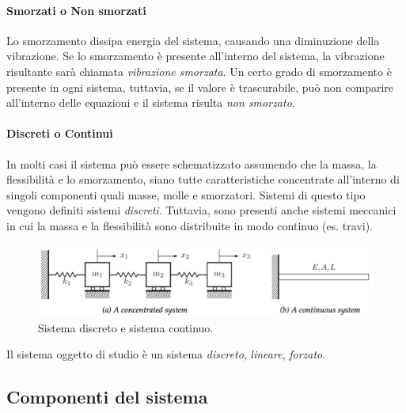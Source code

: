 \paragraph{Smorzati o Non smorzati} Lo smorzamento dissipa energia del sistema, causando una diminuzione della vibrazione. Se lo smorzamento è presente all'interno del sistema, la vibrazione risultante sarà chiamata \textit{vibrazione smorzata}. Un certo grado di smorzamento è presente in ogni sistema, tuttavia, se il valore è trascurabile, può non comparire all'interno delle equazioni e il sistema risulta \textit{non smorzato}.
\paragraph{Discreti o Continui} In molti casi il sistema può essere schematizzato assumendo che la massa, la flessibilità e lo smorzamento, siano tutte caratteristiche concentrate all'interno di singoli componenti quali masse, molle e smorzatori. Sistemi di questo tipo vengono definiti sistemi \textit{discreti}. Tuttavia, sono presenti anche sistemi meccanici in cui la massa e la flessibilità sono distribuite in modo continuo (es. travi).
\begin{figure}[h]
    \centering
    \includegraphics[scale=0.5]{Immagini/DiscretoContinuo.png}
    \caption{Sistema discreto e sistema continuo.}
    \label{DiscretoContinuo}
\end{figure}

Il sistema oggetto di studio è un sistema \textit{discreto}, \textit{lineare}, \textit{forzato}.
\subsection{Componenti del sistema}
